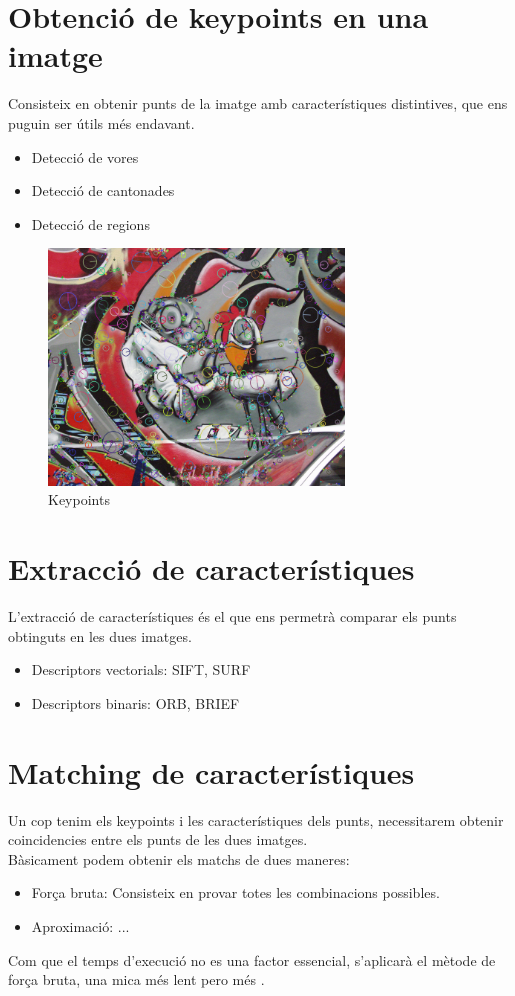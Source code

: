 \section{Obtenció de keypoints en una imatge}
	Consisteix en obtenir punts de la imatge amb característiques distintives, que ens puguin ser útils més endavant.
	\begin{itemize}	
		\item{Detecció de vores}
		\item{Detecció de cantonades}
		\item{Detecció de regions}
	\end{itemize}
	\begin{figure}[H]
		\centering
		\includegraphics[width=0.7\textwidth]{images/RobotKp}
		\caption{Keypoints}
	\end{figure}

\section{Extracció de característiques}

	L'extracció de característiques és el que ens permetrà comparar els punts obtinguts en les dues imatges.
	\begin{itemize}
		\item{Descriptors vectorials: SIFT, SURF}
		\item{Descriptors binaris: ORB, BRIEF}
	\end{itemize}


\section{Matching de característiques}

	Un cop tenim els keypoints i les característiques dels punts, necessitarem obtenir coincidencies entre els punts de les dues imatges.\\
	Bàsicament podem obtenir els matchs de dues maneres:\\
	\begin{itemize}	
		\item{Força bruta: Consisteix en provar totes les combinacions possibles.}
		\item{Aproximació: ...}
	\end{itemize}
	Com que el temps d'execució no es una factor essencial, s'aplicarà el mètode de força bruta, una mica més lent pero més .

